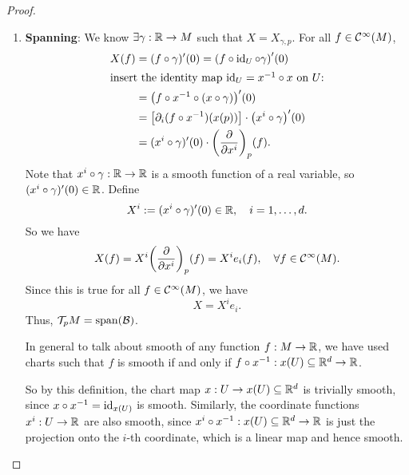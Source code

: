 \begin{proof}
\begin{enumerate}
        \item \textbf{Spanning}: We know \(\exists \gamma: \mathbb R \to M\) such that \(X = X_{\gamma, p}\). For all \(f \in \mathcal C^\infty(M)\),
              \begin{align*}
                  X(f) & = (f \circ \gamma)'(0) = \qty(f \circ \operatorname{id}_U \circ \gamma)'(0)              \\
                  \shortintertext{insert the identity map \(\operatorname{id}_U = x^{-1} \circ x\) on \(U\):}
                       & = \qty(f \circ x^{-1} \circ (x \circ \gamma))'(0)                          \\
                       & = \qty[\partial_i (f \circ x^{-1})(x(p))] \cdot \qty(x^i \circ \gamma)'(0) \\
                       & = (x^i \circ \gamma)'(0) \cdot \qty(\pdv{x^i})_p (f).
              \end{align*}
              Note that \(x^i \circ \gamma: \mathbb R \to \mathbb R\) is a smooth function of a real variable, so \((x^i \circ \gamma)'(0) \in \mathbb R\). Define
              \begin{equation}
                  X^i := (x^i \circ \gamma)'(0) \in \mathbb R, \quad i = 1, \ldots, d.
              \end{equation}
              So we have
              \begin{equation}
                  X(f) = X^i \qty(\pdv{x^i})_p (f) = X^i e_i(f), \quad \forall f \in \mathcal C^\infty(M).
              \end{equation}
              Since this is true for all \(f \in \mathcal C^\infty(M)\), we have
              \begin{equation}
                  X = X^i e_i.
              \end{equation}
              Thus, \(\mathcal T_p M = \operatorname{span}(\mathcal B)\).

              \begin{remark}
                  In general to talk about smooth of any function \(f: M \to \mathbb R\), we have used charts such that \(f\) is smooth if and only if \(f \circ x^{-1}: x(U) \subseteq \mathbb R^d \to \mathbb R\).

                  So by this definition, the chart map \(x: U \to x(U) \subseteq \mathbb R^d\) is trivially smooth, since \(x \circ x^{-1} = \operatorname{id}_{x(U)}\) is smooth. Similarly, the coordinate functions \(x^i: U \to \mathbb R\) are also smooth, since \(x^i \circ x^{-1}: x(U) \subseteq \mathbb R^d \to \mathbb R\) is just the projection onto the \(i\)-th coordinate, which is a linear map and hence smooth.
              \end{remark}


\end{enumerate}
\end{proof}
